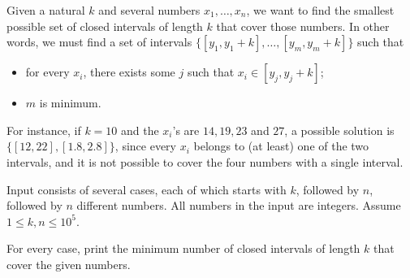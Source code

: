 

\Statement

Given a natural $k$ and several numbers $x_1, \ldots, x_n$,
we want to find the smallest possible set
of closed intervals of length $k$ that cover those numbers.
In other words, we must find a set of intervals
$\{[y_1, y_1 + k], \dots, [y_m, y_m + k]\}$
such that
\begin{itemize}
\item
for every $x_i$,
there exists some $j$ such that $x_i \in [y_j, y_j + k]$;
\item
$m$ is minimum.
\end{itemize}
For instance, if $k=10$ and the $x_i$'s are $14, 19, 23$ and $27$,
a possible solution is
$\{[12, 22], [1.8, 2.8]\}$,
since every $x_i$ belongs to (at least) one of the two intervals,
and it is not possible to cover the four numbers with a single interval.


\Input

Input consists of several cases,
each of which starts with $k$, followed by $n$, followed by $n$ different numbers.
All numbers in the input are integers. Assume $1 \le k, n \le 10^5$.


\Output

For every case, print the minimum number of closed intervals of length
$k$ that cover the given numbers.

\Sample
